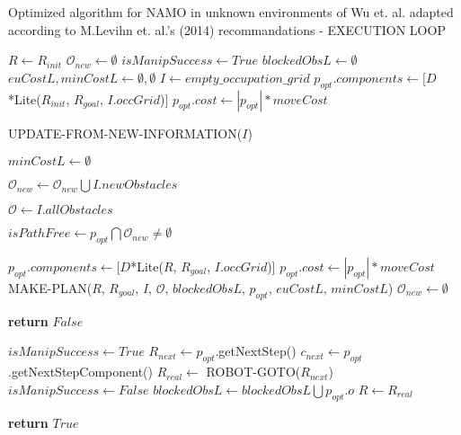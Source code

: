\begin{algorithm}[H]

  \caption{Optimized algorithm for NAMO in unknown environments of Wu et. al. adapted according to M.Levihn et. al.'s (2014) recommandations - EXECUTION LOOP}

  \label{alg:02-levihn-makeandexecuteplan}

  \begin{algorithmic}[1]


      \State $R \gets R_{init}$ \label{lst:line:init1}
      \State $\mathcal{O}_{new} \gets \emptyset$
      \State $isManipSuccess \gets True$
      \State $blockedObsL \gets \emptyset$
      \State $euCostL, minCostL \gets \emptyset, \emptyset$ \label{lst:line:init2}
      \State $I \gets empty\_occupation\_grid$
      \State $p_{opt}.components \gets [D$*Lite($R_{init}$, $R_{goal}$, $I.occGrid$)]
      \State $p_{opt}.cost \gets |p_{opt}| * moveCost$


        \State UPDATE-FROM-NEW-INFORMATION($I$)

         \label{lst:line:second_update-from-new-information_note}
          \State $minCostL \gets \emptyset$
        \EndIf

        \State $\mathcal{O}_{new} \gets \mathcal{O}_{new} \bigcup I.newObstacles$

        \State $\mathcal{O} \gets I.allObstacles$ \label{lst:line:allobstacles}

        \State $isPathFree \gets p_{opt} \bigcap \mathcal{O}_{new} \neq \emptyset$

          \State $p_{opt}.components \gets [D$*Lite($R$, $R_{goal}$, $I.occGrid$)]
          \State $p_{opt}.cost \gets |p_{opt}| * moveCost$
          \State MAKE-PLAN($R$, $R_{goal}$, $I$, $\mathcal{O}$, $blockedObsL$, $p_{opt}$, $euCostL$, $minCostL$)
          \State $\mathcal{O}_{new} \gets \emptyset$
        \EndIf

         \label{lst:line:exec1}
          \State \textbf{return} $False$
        \EndIf \label{lst:line:exec1bis}

        \State $isManipSuccess \gets True$ \label{lst:line:ismanipsuccess}
        \State $R_{next} \gets p_{opt}$.getNextStep() \label{lst:line:exec2bis}
        \State $c_{next} \gets p_{opt}$.getNextStepComponent()
        \State $R_{real} \gets$ ROBOT-GOTO($R_{next}$)
          \State $isManipSuccess \gets False$
          \State $blockedObsL \gets blockedObsL \bigcup p_{opt}.o$
        \EndIf
        \State $R \gets R_{real}$ \label{lst:line:exec2}

      \EndWhile

      \State \textbf{return} $True$

    \EndProcedure

  \end{algorithmic}
\end{algorithm}
